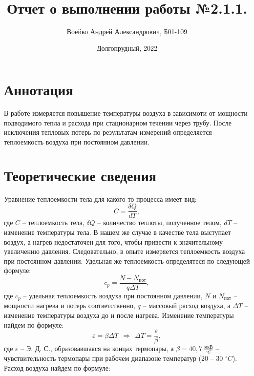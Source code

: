 \documentclass[a4paper,11pt]{article}
\title{Отчет о выполнении работы №2.1.1.}
\author{Воейко Андрей Александрович, Б01-109}
\date{Долгопрудный, 2022}
\begin{document}
\maketitle
\newpage
\section{Аннотация}
В работе измеряется повышение температуры воздуха в зависимоти от мощности подводимого тепла и расхода при стационарном течении через трубу. После исключения тепловых потерь по результатам измерений определяется теплоемкость воздуха при постоянном давлении.
\section{Теоретические сведения}
Уравнение теплоемкости тела для какого-то процесса имеет вид:\newline
\begin{equation}    \label{eq1}
C = \frac{\delta Q}{dT},
\end{equation}
где $C$ -- теплоемкость тела, $\delta Q$ -- количество теплоты, полученное телом, $dT$ -- изменение температуры тела.
В нашем же случае в качестве тела выступает воздух, а нагрев недостаточен для того, чтобы привести к значительному увеличению давления. Следовательно, в опыте измеряется теплоемкость воздуха при постоянном давлении.\newline
Удельная же теплоемкость определятеся по следующей формуле:\newline
\begin{equation}    \label{eq2}
c_{p} = \frac{N - N_{пот}}{q \Delta T},
\end{equation}
где $c_{p}$ -- удельная теплоемкость воздуха при постоянном давлении, $N$ и $N_{пот}$ -- мощности нагрева и потерь соответственно, $q$ -- массовый расход воздуха, а $\Delta T$ -- изменение температуры воздуха до и после нагрева.\newline
Изменение температуры найдем по формуле:\newline
\begin{equation}    \label{eq3}
\varepsilon = \beta \Delta T\ \ \Rightarrow\ \ \Delta T = \frac{\varepsilon}{\beta},
\end{equation}
где $\varepsilon$ -- Э. Д. С., образовавшаяся на концах термопары, а $\beta = 40,7\ \frac{мкВ}{^{\circ}C}$ -- чувствительность термопары при рабочем диапазоне температур (20 -- 30 $^{\circ}C$).\newline
Расход воздуха найдем по формуле:\newline
\end{document}

